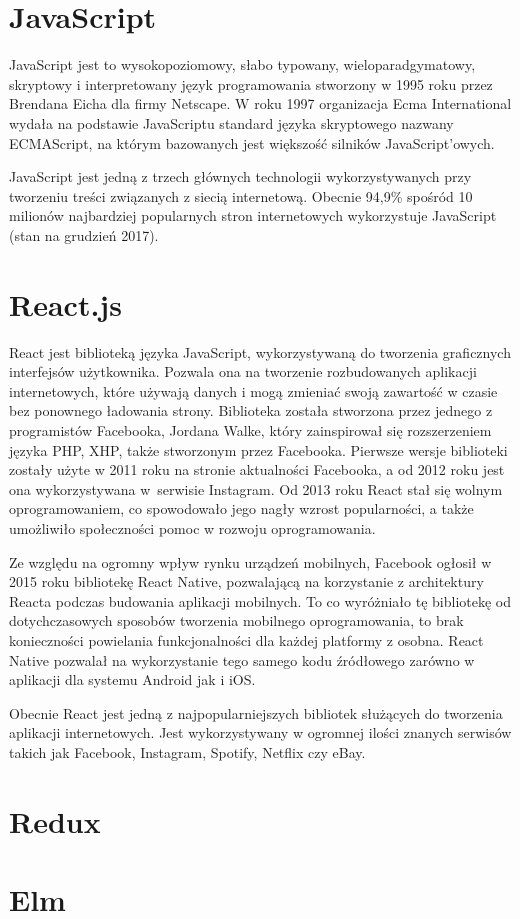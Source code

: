 \section{JavaScript}
JavaScript jest to wysokopoziomowy, słabo typowany, wieloparadgymatowy, skryptowy i interpretowany język programowania stworzony w 1995 roku przez Brendana Eicha dla firmy Netscape.  W roku 1997 organizacja Ecma International wydała na podstawie JavaScriptu standard języka skryptowego nazwany ECMAScript, na którym bazowanych jest większość silników JavaScript'owych.

JavaScript jest jedną z trzech głównych technologii wykorzystywanych przy tworzeniu treści związanych z siecią internetową. Obecnie 94,9\% spośród 10 milionów najbardziej popularnych stron internetowych wykorzystuje JavaScript (stan na grudzień 2017\cite{JSUsage}).

\section{React.js}
React jest biblioteką języka JavaScript, wykorzystywaną do tworzenia graficznych interfejsów użytkownika. Pozwala ona na tworzenie rozbudowanych aplikacji internetowych, które używają danych i mogą zmieniać swoją zawartość w czasie bez ponownego ładowania strony. Biblioteka została stworzona przez jednego z programistów Facebooka, Jordana Walke, który zainspirował się rozszerzeniem języka PHP, XHP, także stworzonym przez Facebooka. Pierwsze wersje biblioteki zostały użyte w 2011 roku na stronie aktualności Facebooka, a od 2012 roku jest ona wykorzystywana w~serwisie Instagram. Od 2013 roku React stał się wolnym oprogramowaniem, co spowodowało jego nagły wzrost popularności, a także umożliwiło społeczności  pomoc w rozwoju oprogramowania.

Ze względu na ogromny wpływ rynku urządzeń mobilnych, Facebook ogłosił w 2015 roku bibliotekę React Native, pozwalającą na korzystanie z architektury Reacta podczas budowania aplikacji mobilnych. To co wyróżniało tę bibliotekę od dotychczasowych sposobów tworzenia mobilnego oprogramowania, to brak konieczności powielania funkcjonalności dla każdej platformy z osobna. React Native pozwalał na wykorzystanie tego samego kodu źródłowego zarówno w aplikacji dla systemu Android jak i iOS.

Obecnie React jest jedną z najpopularniejszych bibliotek służących do tworzenia aplikacji internetowych. Jest wykorzystywany w ogromnej ilości znanych serwisów takich jak Facebook, Instagram, Spotify, Netflix czy eBay. 
\section{Redux}

\section{Elm}
